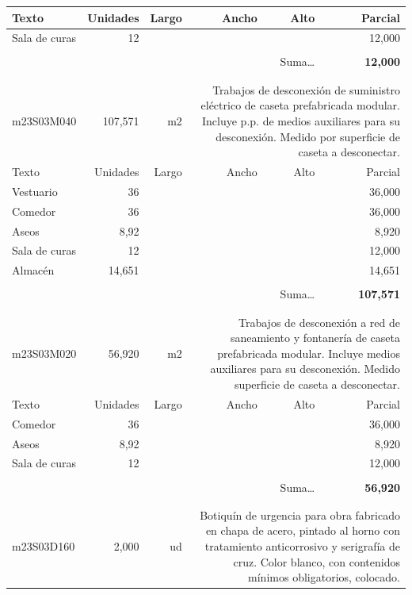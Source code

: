 \documentclass{book}%
\begin{document}
\begin{longtable}{lrrrrr}
Texto&Unidades&Largo&Ancho&Alto&Parcial\\%
\hline%
\multicolumn{1}{p{3.5cm}}{Sala de curas}&12&&&&    12,000\\%
&&&&&\\%
\multicolumn{5}{r}{Suma\ldots}&\textbf{    12,000}\\%
\hline%
&&&&&\\%
&&&&&\\%
m23S03M040&   107,571& m2&\multicolumn{3}{p{6cm}}{\scriptsize Trabajos de desconexión de suministro eléctrico de caseta prefabricada modular. Incluye p.p. de medios auxiliares para su desconexión. Medido por superficie de caseta a desconectar.\normalsize}\\%
Texto&Unidades&Largo&Ancho&Alto&Parcial\\%
\hline%
\multicolumn{1}{p{3.5cm}}{Vestuario}&36&&&&    36,000\\%
\multicolumn{1}{p{3.5cm}}{Comedor}&36&&&&    36,000\\%
\multicolumn{1}{p{3.5cm}}{Aseos}&8,92&&&&     8,920\\%
\multicolumn{1}{p{3.5cm}}{Sala de curas}&12&&&&    12,000\\%
\multicolumn{1}{p{3.5cm}}{Almacén}&14,651&&&&    14,651\\%
&&&&&\\%
\multicolumn{5}{r}{Suma\ldots}&\textbf{   107,571}\\%
\hline%
&&&&&\\%
&&&&&\\%
m23S03M020&    56,920& m2&\multicolumn{3}{p{6cm}}{\scriptsize Trabajos de desconexión a red de saneamiento y fontanería de caseta prefabricada modular. Incluye medios auxiliares para su desconexión. Medido superficie de caseta a desconectar.\normalsize}\\%
Texto&Unidades&Largo&Ancho&Alto&Parcial\\%
\hline%
\multicolumn{1}{p{3.5cm}}{Comedor}&36&&&&    36,000\\%
\multicolumn{1}{p{3.5cm}}{Aseos}&8,92&&&&     8,920\\%
\multicolumn{1}{p{3.5cm}}{Sala de curas}&12&&&&    12,000\\%
&&&&&\\%
\multicolumn{5}{r}{Suma\ldots}&\textbf{    56,920}\\%
\hline%
&&&&&\\%
&&&&&\\%
m23S03D160&     2,000& ud&\multicolumn{3}{p{6cm}}{\scriptsize Botiquín de urgencia para obra fabricado en chapa de acero, pintado al horno con tratamiento anticorrosivo y serigrafía de cruz. Color blanco, con contenidos mínimos obligatorios, colocado.\normalsize}\\%

\end{longtable}
\end{document}

